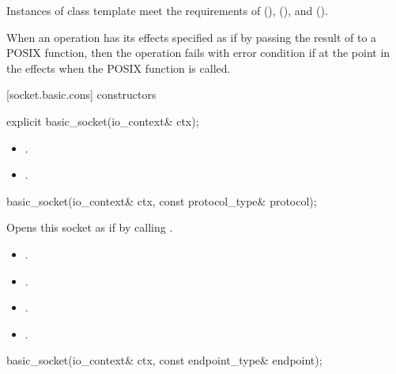 \pnum
Instances of class template  meet the requirements of  (),  (), and  ().

\pnum
When an operation has its effects specified as if by passing the result of  to a POSIX function, then the operation fails with error condition  if  at the point in the effects when the POSIX function is called.


[socket.basic.cons]{ constructors}

\begin{itemdecl}
explicit basic_socket(io_context& ctx);
\end{itemdecl}

\begin{itemdescr}
\pnum
\postconditions
\begin{itemize}
\item
{}.
\item
{}.
\end{itemize}
\end{itemdescr}

\begin{itemdecl}
basic_socket(io_context& ctx, const protocol_type& protocol);
\end{itemdecl}

\begin{itemdescr}
\pnum
\effects Opens this socket as if by calling .

\pnum
\postconditions
\begin{itemize}
\item
{}.
\item
{}.
\item
{}.
\item
{}.
\end{itemize}
\end{itemdescr}

\begin{itemdecl}
basic_socket(io_context& ctx, const endpoint_type& endpoint);
\end{itemdecl}

